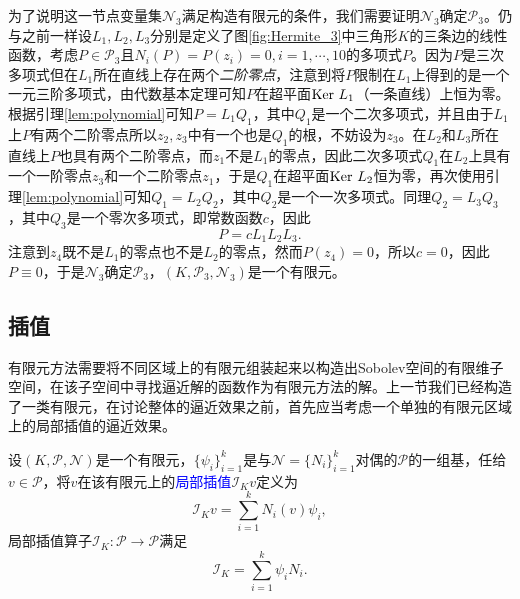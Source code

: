 \documentclass[a4paper,10pt]{ctexart}
\begin{document}
为了说明这一节点变量集$ \mathcal{N}_3 $满足构造有限元的条件，我们需要证明$ \mathcal{N}_3 $确定$ \mathcal{P}_3 $。仍与之前一样设$ L_1,L_2,L_3 $分别是定义了图\ref{fig:Hermite_3}中三角形$ K $的三条边的线性函数，考虑$ P\in \mathcal{P}_3 $且$ N_i(P) = P(z_i) = 0,i=1,\cdots ,10 $的多项式$ P $。因为$ P $是三次多项式但在$ L_1 $所在直线上存在两个\emph{二阶零点}，注意到将$ P $限制在$ L_1 $上得到的是一个一元三阶多项式，由代数基本定理可知$ P $在超平面$ {\rm Ker}\ L_1 $（一条直线）上恒为零。根据引理\ref{lem:polynomial}可知$ P = L_1Q_1 $，其中$ Q_1 $是一个二次多项式，并且由于$ L_1 $上$ P $有两个二阶零点所以$ z_2,z_3 $中有一个也是$ Q_1 $的根，不妨设为$ z_3 $。在$ L_2 $和$ L_3 $所在直线上$ P $也具有两个二阶零点，而$ z_1 $不是$ L_1 $的零点，因此二次多项式$ Q_1 $在$ L_2 $上具有一个一阶零点$ z_3 $和一个二阶零点$ z_1 $，于是$ Q_1 $在超平面$ {\rm Ker}\ L_2 $恒为零，再次使用引理\ref{lem:polynomial}可知$ Q_1 = L_2 Q_2 $，其中$ Q_2 $是一个一次多项式。同理$ Q_2 = L_3 Q_3 $，其中$ Q_3 $是一个零次多项式，即常数函数$ c $，因此
\[
    P = cL_1L_2L_3.
\]
注意到$ z_4 $既不是$ L_1 $的零点也不是$ L_2 $的零点，然而$ P(z_4)=0 $，所以$ c=0 $，因此$ P \equiv 0 $，于是$ \mathcal{N}_3 $确定$ \mathcal{P}_3 $，$ (K,\mathcal{P}_3,\mathcal{N}_3) $是一个有限元。

\subsection{插值}
有限元方法需要将不同区域上的有限元组装起来以构造出Sobolev空间的有限维子空间，在该子空间中寻找逼近解的函数作为有限元方法的解。上一节我们已经构造了一类有限元，在讨论整体的逼近效果之前，首先应当考虑一个单独的有限元区域上的局部插值的逼近效果。
\begin{definition}
    设$ (K,\mathcal{P},\mathcal{N}) $是一个有限元，$ \{\psi_i\}_{i=1}^k $是与$ \mathcal{N}=\{N_i\}_{i=1}^k $对偶的$ \mathcal{P} $的一组基，任给$ v\in \mathcal{P} $，将$ v $在该有限元上的\textcolor{blue}{局部插值}$ \mathcal{I}_K v $定义为
    \begin{equation}
        \mathcal{I}_K v = \sum_{i=1}^k N_i(v)\psi_i,
    \end{equation}
    局部插值算子$ \mathcal{I}_K: \mathcal{P}\to \mathcal{P} $满足
    \begin{equation}
        \mathcal{I}_K = \sum_{i=1}^k \psi_i N_i.
    \end{equation}
\end{definition}
\end{document}
